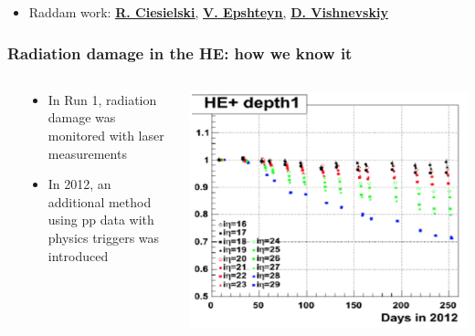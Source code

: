 \documentclass[bigger]{beamer}
\providecommand{\alert}[1]{\textbf{#1}}
\begin{document}
\begin{frame}
\begin{itemize}
\item Raddam work: \href{mailto:Robert.Ciesielski@cern.ch}{\underline{\alert{R. Ciesielski}}}, \href{mailto:vladimir.epshteyn@cern.ch}{\underline{\alert{V. Epshteyn}}}, \href{mailto:dmitry.vishnevskiy@cern.ch}{\underline{\alert{D. Vishnevskiy}}}
\label{sec-2-2-1-2}%
\end{itemize} %
\end{frame}
\begin{frame}
\frametitle{Radiation damage in the HE: how we know it}
\label{sec-2-2-2}
\begin{columns} %
\label{sec-2-2-2-1}
\begin{column}{0.55\textwidth}
\label{sec-2-2-2-1-1}
\begin{itemize}

\item In Run 1, radiation damage was monitored with laser measurements
\label{sec-2-2-2-1-1-1}%

\item In 2012, an additional method using pp data with physics triggers was introduced
\label{sec-2-2-2-1-1-2}%
\end{itemize} %
\end{column}
\begin{column}{0.55\textwidth}
\label{sec-2-2-2-1-2}

\centering
\includegraphics[width=.9\linewidth]{fig/HElaser.png}
\end{column}
\end{columns}
\end{frame}
\end{document}
